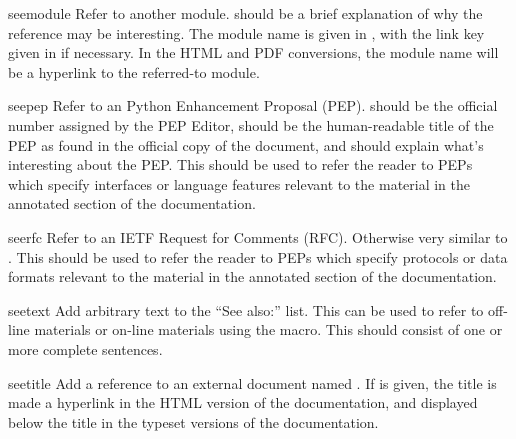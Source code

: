 \documentclass{howto}
\begin{document}
    \begin{macrodesc}{seemodule}{}
      Refer to another module.   should be a brief
      explanation of why the reference may be interesting.  The module
      name is given in , with the link key given in
       if necessary.  In the HTML and PDF conversions, the
      module name will be a hyperlink to the referred-to module.
    \end{macrodesc}

    \begin{macrodesc}{seepep}{}
      Refer to an Python Enhancement Proposal (PEP).  
      should be the official number assigned by the PEP Editor,
       should be the human-readable title of the PEP as
      found in the official copy of the document, and  should
      explain what's interesting about the PEP.  This should be used
      to refer the reader to PEPs which specify interfaces or language
      features relevant to the material in the annotated section of the
      documentation.
    \end{macrodesc}

    \begin{macrodesc}{seerfc}{}
      Refer to an IETF Request for Comments (RFC).  Otherwise very
      similar to .  This should be used
      to refer the reader to PEPs which specify protocols or data
      formats relevant to the material in the annotated section of the
      documentation.
    \end{macrodesc}

    \begin{macrodesc}{seetext}{}
      Add arbitrary text  to the ``See also:'' list.  This
      can be used to refer to off-line materials or on-line materials
      using the  macro.  This should consist of one or more
      complete sentences.
    \end{macrodesc}

    \begin{macrodesc}{seetitle}{}
      Add a reference to an external document named .  If
       is given, the title is made a hyperlink in the HTML
      version of the documentation, and displayed below the title in
      the typeset versions of the documentation.
    \end{macrodesc}
\end{document}
